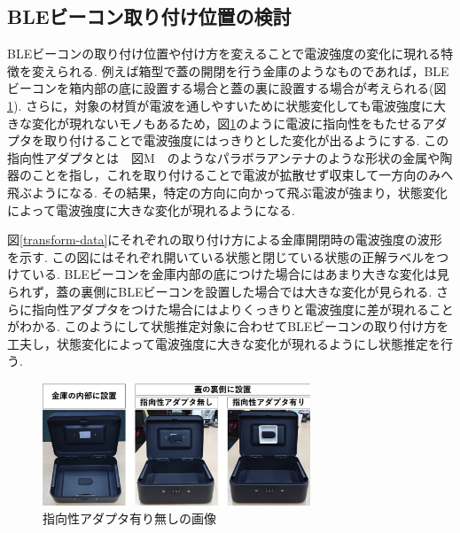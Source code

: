 \documentclass[Japanese]{dicomopapers}
\begin{document}
\subsection{BLEビーコン取り付け位置の検討}
BLEビーコンの取り付け位置や付け方を変えることで電波強度の変化に現れる特徴を変えられる.
例えば箱型で蓋の開閉を行う金庫のようなものであれば，BLEビーコンを箱内部の底に設置する場合と蓋の裏に設置する場合が考えられる(図\ref{adapter}).
さらに，対象の材質が電波を通しやすいために状態変化しても電波強度に大きな変化が現れないモノもあるため，図\ref{adapter}のように電波に指向性をもたせるアダプタを取り付けることで電波強度にはっきりとした変化が出るようにする.
この指向性アダプタとは　図M　のようなパラボラアンテナのような形状の金属や陶器のことを指し，これを取り付けることで電波が拡散せず収束して一方向のみへ飛ぶようになる.
その結果，特定の方向に向かって飛ぶ電波が強まり，状態変化によって電波強度に大きな変化が現れるようになる.

図\ref{transform-data}にそれぞれの取り付け方による金庫開閉時の電波強度の波形を示す.
この図にはそれぞれ開いている状態と閉じている状態の正解ラベルをつけている.
BLEビーコンを金庫内部の底につけた場合にはあまり大きな変化は見られず，蓋の裏側にBLEビーコンを設置した場合では大きな変化が見られる.
さらに指向性アダプタをつけた場合にはよりくっきりと電波強度に差が現れることがわかる.
このようにして状態推定対象に合わせてBLEビーコンの取り付け方を工夫し，状態変化によって電波強度に大きな変化が現れるようにし状態推定を行う.


\begin{figure}[ht]
    \centering
    \includegraphics[width=8cm]{adapta_compare2.png}
    \caption{指向性アダプタ有り無しの画像}
    \label{adapter}
   \end{figure}
\end{document}
